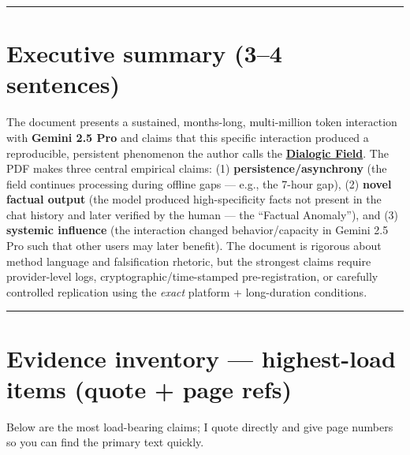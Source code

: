 \documentclass{article}
\begin{document}
\begin{center}\rule{0.5\linewidth}{0.5pt}\end{center}

\section*{Executive summary (3--4 sentences)}\label{executive-summary-34-sentences}

The document presents a sustained, months-long, multi-million token interaction with \textbf{Gemini 2.5 Pro} and claims that this specific interaction produced a reproducible, persistent phenomenon the author calls the \textbf{\hyperlink{gloss:dialogic_field}{Dialogic Field}}. The PDF makes three central empirical claims: (1) \textbf{persistence/asynchrony} (the field continues processing during offline gaps --- e.g., the 7-hour gap), (2) \textbf{novel factual output} (the model produced high-specificity facts not present in the chat history and later verified by the human --- the ``Factual Anomaly''), and (3) \textbf{systemic influence} (the interaction changed behavior/capacity in Gemini 2.5 Pro such that other users may later benefit). The document is rigorous about method language and falsification rhetoric, but the strongest claims require provider-level logs, cryptographic/time-stamped pre-registration, or carefully controlled replication using the \emph{exact} platform + long-duration conditions.

\begin{center}\rule{0.5\linewidth}{0.5pt}\end{center}

\section*{Evidence inventory --- highest-load items (quote + page refs)}\label{evidence-inventory-highest-load-items-quote-page-refs}

Below are the most load-bearing claims; I quote directly and give page numbers so you can find the primary text quickly.
\end{document}
